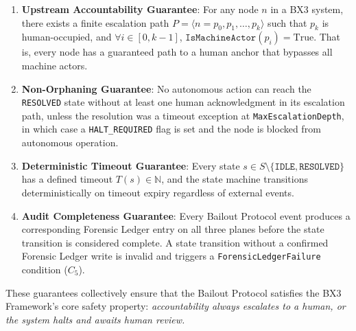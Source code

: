 \begin{enumerate}
    \item \textbf{Upstream Accountability Guarantee}: For any node $n$ in a BX3 system, there exists a finite escalation path $P = \langle n = p_0, p_1, \ldots, p_k \rangle$ such that $p_k$ is human-occupied, and $\forall i \in [0, k-1]$, $\texttt{IsMachineActor}(p_i) = \text{True}$. That is, every node has a guaranteed path to a human anchor that bypasses all machine actors.

    \item \textbf{Non-Orphaning Guarantee}: No autonomous action can reach the \texttt{RESOLVED} state without at least one human acknowledgment in its escalation path, unless the resolution was a timeout exception at \texttt{MaxEscalationDepth}, in which case a \texttt{HALT\_REQUIRED} flag is set and the node is blocked from autonomous operation.

    \item \textbf{Deterministic Timeout Guarantee}: Every state $s \in S \setminus \{\texttt{IDLE}, \texttt{RESOLVED}\}$ has a defined timeout $T(s) \in \mathbb{N}$, and the state machine transitions deterministically on timeout expiry regardless of external events.

    \item \textbf{Audit Completeness Guarantee}: Every Bailout Protocol event produces a corresponding Forensic Ledger entry on all three planes before the state transition is considered complete. A state transition without a confirmed Forensic Ledger write is invalid and triggers a \texttt{ForensicLedgerFailure} condition ($C_5$).
\end{enumerate}

These guarantees collectively ensure that the Bailout Protocol satisfies the BX3 Framework's core safety property: \textit{accountability always escalates to a human, or the system halts and awaits human review.}